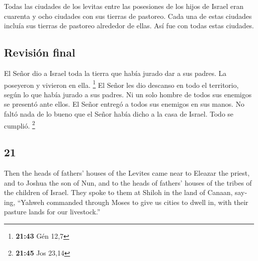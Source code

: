 \begin{paracol}{2}
 Todas las ciudades de los levitas entre las posesiones
de los hijos de Israel eran cuarenta y ocho ciudades con sus tierras de
pastoreo.  Cada una de estas ciudades incluía sus tierras
de pastoreo alrededor de ellas. Así fue con todas estas ciudades.

\hypertarget{revisiuxf3n-final}{%
\subsection{Revisión final}\label{revisiuxf3n-final}}

 El Señor dio a Israel toda la tierra que había jurado
dar a sus padres. La poseyeron y vivieron en ella. \footnote{\textbf{21:43}
  Gén 12,7}  El Señor les dio descanso en todo el
territorio, según lo que había jurado a sus padres. Ni un solo hombre de
todos sus enemigos se presentó ante ellos. El Señor entregó a todos sus
enemigos en sus manos.  No faltó nada de lo bueno que el
Señor había dicho a la casa de Israel. Todo se cumplió. \footnote{\textbf{21:45}
  Jos 23,14}

\switchcolumn
\begin{otherlanguage}{english}

\hypertarget{section-41}{%
\section{21}\label{section-41}}

 Then the heads of fathers' houses of the Levites came
near to Eleazar the priest, and to Joshua the son of Nun, and to the
heads of fathers' houses of the tribes of the children of Israel.
 They spoke to them at Shiloh in the land of Canaan,
saying, ``Yahweh commanded through Moses to give us cities to dwell in,
with their pasture lands for our livestock.''


\end{otherlanguage}
\end{paracol}
